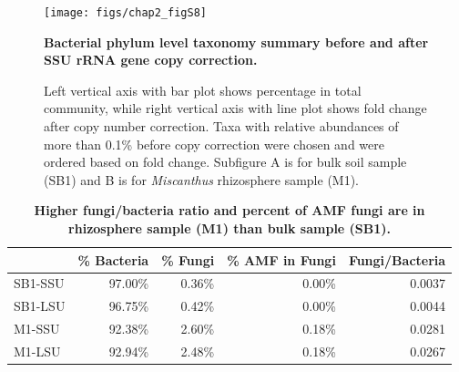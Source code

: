\documentclass[]{msu-thesis}
\begin{document}

\begin{figure}[tbph!]
  \captionsetup{list=yes}
  \centering
  \texttt{[image: figs/chap2\_figS8]}
  \caption[Bacterial phylum level taxonomy summary before and after SSU rRNA gene copy correction]{\textbf{Bacterial phylum level taxonomy summary before and after SSU rRNA gene copy correction.}}
  \label{fig:chap2FigS8}
\end{figure}
\clearpage
\begin{figure}
  \captionsetup{labelformat=adja-page,list=no}
  \ContinuedFloat
  \caption[]{Left vertical axis with bar plot shows percentage in total community, while right vertical axis with line plot shows fold change after copy number correction. Taxa with relative abundances of more than 0.1\% before copy correction were chosen and were ordered based on fold change. Subfigure A is for bulk soil sample (SB1) and B is for \textit{Miscanthus} rhizosphere sample (M1).}
\end{figure}

\begin{table}[phtb]
  \centering
  \caption[Higher fungi/bacteria ratio and percent of AMF fungi are in rhizosphere sample (M1) than bulk sample (SB1)]{\textbf{Higher fungi/bacteria ratio and percent of AMF fungi are in rhizosphere sample (M1) than bulk sample (SB1).}}
    \begin{tabular}{|l|r|r|r|r|}
    \toprule
          & \multicolumn{1}{l|}{\% Bacteria} & \multicolumn{1}{l|}{\% Fungi} & \multicolumn{1}{l|}{\% AMF in Fungi} & \multicolumn{1}{l|}{Fungi/Bacteria} \\
    \midrule
    SB1-SSU & 97.00\% & 0.36\% & 0.00\% & 0.0037 \\
    \midrule
    SB1-LSU & 96.75\% & 0.42\% & 0.00\% & 0.0044 \\
    \midrule
    M1-SSU & 92.38\% & 2.60\% & 0.18\% & 0.0281 \\
    \midrule
    M1-LSU & 92.94\% & 2.48\% & 0.18\% & 0.0267 \\
    \bottomrule
    \end{tabular}%
  \label{tab:chap2TabS1}%
\end{table}%
\end{document}
